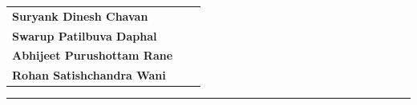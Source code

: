 \vspace{10mm}

\begin{flushleft}
\begin{tabular}{@{}p{6.0cm}l@{}l@{}}
\textbf{Suryank Dinesh Chavan} \\[1mm]
\textbf{Swarup Patilbuva Daphal} \\[1mm]
\textbf{Abhijeet Purushottam Rane} \\[1mm]
\textbf{Rohan Satishchandra Wani} \\[1mm]
\end{tabular}
\vspace*{3mm}
\end{flushleft}
\vspace*{5mm}

\hrule
